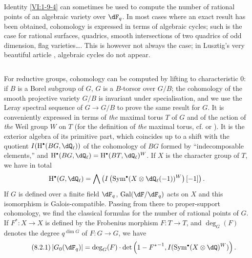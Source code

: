 \subsection{}\label{VI:8-1}

Identity \ref{VI:1-9-4} can sometimes be used to compute
the number of rational points of an algebraic variety over $\dF_q$. In
most cases where an exact result has been obtained, cohomology
is expressed in terms of algebraic cycles; such is the case for rational
surfaces, quadrics, smooth intersections of two quadrics of
odd dimension, flag varieties\ldots. This is however not
always the case; in Lusztig's very beautiful article \cite{lu76}, algebraic
cycles do not appear. 





\subsection{}\label{VI:8-2}

For reductive groups, cohomology can be computed by lifting to
characteristic $0$: if $B$ is a Borel subgroup of $G$, $G$ is a
$B$-torsor over $G/B$; the cohomology of the smooth projective variety
$G/B$ is invariant under specialisation, and we use the Leray
spectral sequence of $G\to G/B$ to prove the same result for $G$. It is
conveniently expressed in terms of \emph{the} maximal torus $T$ of $G$ and of the
action of \emph{the} Weil group $W$ on $T$ (for the definition of \emph{the}
maximal torus, cf. \cite[VIII \S 2 Rem.2]{bo05} or \cite[p.105]{dl76}). It is
the exterior algebra of its primitive part, which coincides up to a shift
with the quotient $I(\h^\bullet(B G,\dQ_\ell))$ of the cohomology of
$B G$ formed by ``indecomposable elements,'' and
$\h^\bullet(B G,\dQ_\ell)=\h^\bullet(B T,\dQ_\ell)^W$. If $X$ is the
character group of $T$, we have in total 
\[
  \h^\bullet(G,\dQ_\ell) = \bigwedge \left(I\left(\operatorname{Sym}^\bullet(X\otimes \dQ_\ell(-1))^W\right)[-1]\right) \text{.}
\]
If $G$ is defined over a finite field $\dF_q$, $\gal(\dF/\dF_q)$ acts on $X$
and this isomorphism is Galois-compatible. Passing from there to
proper-support cohomology, we find the classical formulas for the
number of rational points of $G$. If $F^\ast:X\to X$ is defined by the
Frobenius morphism $F:T\to T$, and $\deg_G(F)$ denotes the degree
$q^{\dim G}$ of $F:G\to G$, we have 
\begin{equation*}\tag{8.2.1}\label{VI:eq:8-2-1}
  \left|G_0(\dF_q)\right| = \deg_G(F) \cdot \det\left(1-{F^\ast}^{-1},I(\operatorname{Sym}^\bullet(X\otimes \dQ)^W)\right) \text{.}
\end{equation*}

